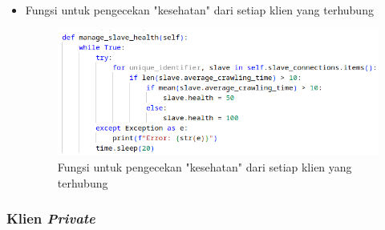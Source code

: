 \begin{itemize}
	\clearpage
	\item{Fungsi untuk pengecekan "kesehatan" dari setiap klien yang terhubung}
	\begin{figure}[H]
		\centering{}
		\includegraphics[width=1\textwidth]{gambar/kode/potongan_client_08}
		\caption{Fungsi untuk pengecekan "kesehatan" dari setiap klien yang terhubung}
	\end{figure}
\end{itemize}

\subsubsection{Klien \emph{Private}}

